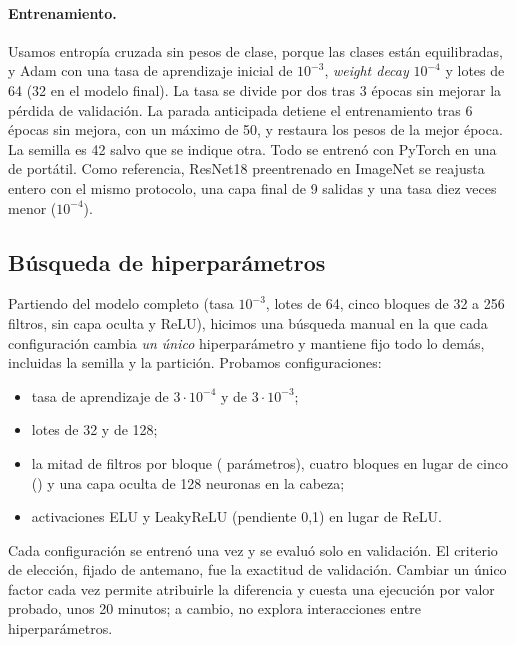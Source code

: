 \paragraph{Entrenamiento.}
Usamos entropía cruzada sin pesos de clase, porque las clases están equilibradas, y Adam
\citep{kingma2015adam} con una tasa de aprendizaje inicial de $10^{-3}$, \emph{weight decay}
$10^{-4}$ y lotes de 64 (32 en el modelo final). La tasa se divide por dos tras 3 épocas sin mejorar
la pérdida de validación. La parada anticipada \citep{prechelt1998early} detiene el entrenamiento
tras 6 épocas sin mejora, con un máximo de 50, y restaura los pesos de la mejor época. La semilla
es 42 salvo que se indique otra. Todo se entrenó con PyTorch \VersionTorch{} en una \GPU{} de
portátil. Como referencia, ResNet18 preentrenado en ImageNet \citep{deng2009imagenet} se reajusta
entero con el mismo protocolo, una capa final de 9 salidas y una tasa diez veces menor
($10^{-4}$).

\subsection{Búsqueda de hiperparámetros}
\label{sec:busqueda-metodo}

Partiendo del modelo completo (tasa $10^{-3}$, lotes de 64, cinco bloques de 32 a 256 filtros,
sin capa oculta y ReLU), hicimos una búsqueda manual en la que cada configuración cambia
\emph{un único} hiperparámetro y mantiene fijo todo lo demás, incluidas la semilla y la partición.
Probamos \NConfigsBusqueda{} configuraciones:
\begin{itemize}
  \item tasa de aprendizaje de $3\cdot10^{-4}$ y de $3\cdot10^{-3}$;
  \item lotes de 32 y de 128;
  \item la mitad de filtros por bloque (\ParamsFiltrosMitad{} parámetros), cuatro bloques en lugar
    de cinco (\ParamsCuatroBloques) y una capa oculta de 128 neuronas en la cabeza;
  \item activaciones ELU \citep{clevert2016elu} y LeakyReLU (pendiente 0,1) en lugar de ReLU.
\end{itemize}
Cada configuración se entrenó una vez y se evaluó solo en validación. El criterio de elección,
fijado de antemano, fue la exactitud de validación. Cambiar un único factor cada vez permite
atribuirle la diferencia y cuesta una ejecución por valor probado, unos 20 minutos; a cambio, no
explora interacciones entre hiperparámetros.

